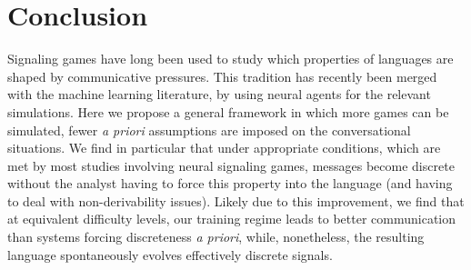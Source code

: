 \documentclass[11pt,a4paper]{article}
\newcommand{\nbEC}[1]{{\leavevmode\color{blue}{\scriptsize#1}}}
\begin{document}
\nbEC{We can either drop the discussion section, or move there the last paragraph of the communicative success and discreteness sections, adding a note saying that compositionality failed (but that high level of compositionality where never reached?).}

\section{Conclusion}

Signaling games have long been used to study which properties of languages are shaped by communicative pressures. This tradition has recently been merged with the machine learning literature, by using neural agents for the relevant simulations. Here we propose a general framework in which more games can be simulated, fewer \emph{a priori} assumptions are imposed on the conversational situations. We find in particular that under appropriate conditions, which are met by most\nbEC{all} studies involving neural signaling games, messages become discrete without the analyst having to force this property into the language (and having to deal with non-derivability issues). Likely due to this improvement, we find that at equivalent difficulty levels, our training regime leads to better communication than systems forcing discreteness \emph{a priori}, while, nonetheless, the resulting language spontaneously evolves effectively discrete signals. 






\end{document}
